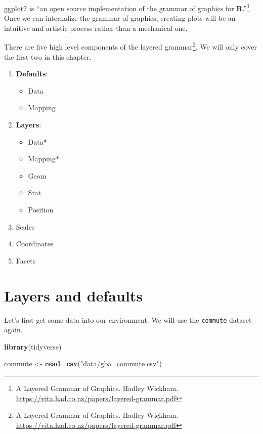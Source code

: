 \documentclass[
]{book}
\newenvironment{Shaded}{\begin{snugshade}}{\end{snugshade}}
\newcommand{\KeywordTok}[1]{\textcolor[rgb]{0.13,0.29,0.53}{\textbf{#1}}}
\newcommand{\NormalTok}[1]{#1}
\newcommand{\StringTok}[1]{\textcolor[rgb]{0.31,0.60,0.02}{#1}}
\providecommand{\tightlist}{%
  \setlength{\itemsep}{0pt}\setlength{\parskip}{0pt}}
\begin{document}
ggplot2 is ``an open source implementation of the grammar of graphics for \textbf{R}.''\footnote{A Layered Grammar of Graphics. Hadley Wickham. \url{https://vita.had.co.nz/papers/layered-grammar.pdf}} Once we can internalize the grammar of graphics, creating plots will be an intuitive and artistic process rather than a mechanical one.

There are five high level components of the layered grammar\footnote{A Layered Grammar of Graphics. Hadley Wickham. \url{https://vita.had.co.nz/papers/layered-grammar.pdf}}. We will only cover the first two in this chapter.

\begin{enumerate}
\def\labelenumi{\arabic{enumi}.}
\tightlist
\item
  \textbf{Defaults}:

  \begin{itemize}
  \tightlist
  \item
    Data
  \item
    Mapping
  \end{itemize}
\item
  \textbf{Layers}:

  \begin{itemize}
  \tightlist
  \item
    Data*
  \item
    Mapping*
  \item
    Geom
  \item
    Stat
  \item
    Position
  \end{itemize}
\item
  Scales
\item
  Coordinates
\item
  Facets
\end{enumerate}

\hypertarget{layers-and-defaults}{%
\section{Layers and defaults}\label{layers-and-defaults}}

Let's first get some data into our environment. We will use the \texttt{commute} dataset again.

\begin{Shaded}
\begin{Highlighting}[]
\KeywordTok{library}\NormalTok{(tidyverse)}

\NormalTok{commute \textless{}{-}}\StringTok{ }\KeywordTok{read\_csv}\NormalTok{(}\StringTok{"data/gba\_commute.csv"}\NormalTok{)}
\end{Highlighting}
\end{Shaded}
\end{document}
